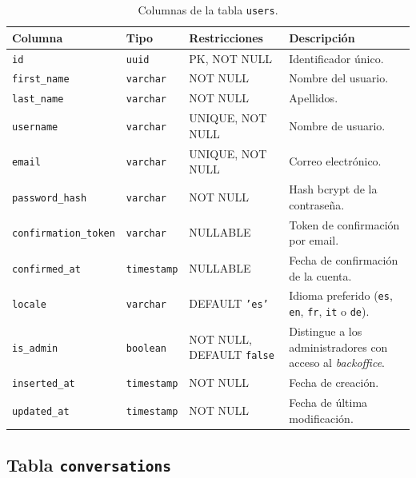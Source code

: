\begin{table}[H]
\centering
\footnotesize
\caption{Columnas de la tabla \texttt{users}.}
\label{tab:users}
\begin{tabular}{llP{3.2cm}P{4.5cm}}
\hline
\textbf{Columna} & \textbf{Tipo} & \textbf{Restricciones} & \textbf{Descripción} \\
\hline
\texttt{id}                  & \texttt{uuid}          & PK, NOT NULL      & Identificador único. \\
\texttt{first\_name}         & \texttt{varchar}       & NOT NULL          & Nombre del usuario. \\
\texttt{last\_name}          & \texttt{varchar}       & NOT NULL          & Apellidos. \\
\texttt{username}            & \texttt{varchar}       & UNIQUE, NOT NULL  & Nombre de usuario. \\
\texttt{email}               & \texttt{varchar}       & UNIQUE, NOT NULL  & Correo electrónico. \\
\texttt{password\_hash}      & \texttt{varchar}       & NOT NULL          & Hash bcrypt de la contraseña. \\
\texttt{confirmation\_token} & \texttt{varchar}       & NULLABLE          & Token de confirmación por email. \\
\texttt{confirmed\_at}       & \texttt{timestamp}   & NULLABLE          & Fecha de confirmación de la cuenta. \\
\texttt{locale}              & \texttt{varchar}       & DEFAULT \texttt{'es'} & Idioma preferido (\texttt{es}, \texttt{en}, \texttt{fr}, \texttt{it} o \texttt{de}). \\
\texttt{is\_admin}           & \texttt{boolean}       & NOT NULL, DEFAULT \texttt{false} & Distingue a los administradores con acceso al \emph{backoffice}. \\
\texttt{inserted\_at}        & \texttt{timestamp}   & NOT NULL          & Fecha de creación. \\
\texttt{updated\_at}         & \texttt{timestamp}   & NOT NULL          & Fecha de última modificación. \\
\hline
\end{tabular}
\end{table}

\subsection{Tabla \texttt{conversations}}

